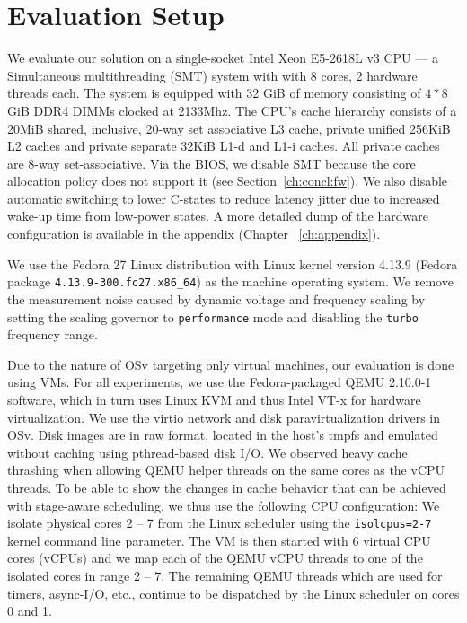 \documentclass[12pt,a4paper]{book}
\begin{document}
\clearpage
\section{Evaluation Setup}\label{ch:eval:setup}
% 




We evaluate our solution on a single-socket Intel Xeon E5-2618L v3 CPU --- a Simultaneous multithreading (SMT) system with with 8 cores, 2 hardware threads each.
The system is equipped with 32 GiB of memory consisting of $4*8$ GiB DDR4 DIMMs clocked at 2133Mhz.
The CPU's cache hierarchy consists of a 20MiB shared, inclusive, 20-way set associative L3 cache, private unified 256KiB L2 caches and private separate 32KiB L1-d and L1-i caches.
All private caches are 8-way set-associative.
Via the BIOS, we disable SMT because the core allocation policy does not support it (see Section~\ref{ch:concl:fw}).
We also disable automatic switching to lower C-states to reduce latency jitter due to increased wake-up time from low-power states.
A more detailed dump of the hardware configuration is available in the appendix (Chapter ~\ref{ch:appendix}).

We use the Fedora 27 Linux distribution with Linux kernel version 4.13.9 (Fedora package \lstinline[style=figurecpp]{4.13.9-300.fc27.x86_64}) as the machine operating system.
We remove the measurement noise caused by dynamic voltage and frequency scaling by setting the scaling governor to \lstinline[style=figurecpp]{performance} mode and disabling the \lstinline[style=figurecpp]{turbo} frequency range.

Due to the nature of OSv targeting only virtual machines, our evaluation is done using VMs.
For all experiments, we use the Fedora-packaged QEMU 2.10.0-1 software, which in turn uses Linux KVM and thus Intel VT-x for hardware virtualization.
We use the virtio network and disk paravirtualization drivers in OSv.
Disk images are in raw format, located in the host's tmpfs and emulated without caching using pthread-based disk I/O.
We observed heavy cache thrashing when allowing QEMU helper threads on the same cores as the vCPU threads.
To be able to show the changes in cache behavior that can be achieved with stage-aware scheduling, we thus use the following CPU configuration:
We isolate physical cores 2 -- 7 from the Linux scheduler using the \lstinline[style=figurecpp]{isolcpus=2-7} kernel command line parameter.
The VM is then started with 6 virtual CPU cores (vCPUs) and we map each of the QEMU vCPU threads to one of the isolated cores in range 2 -- 7.
The remaining QEMU threads which are used for timers, async-I/O, etc., continue to be dispatched by the Linux scheduler on cores 0 and 1.
\end{document}
